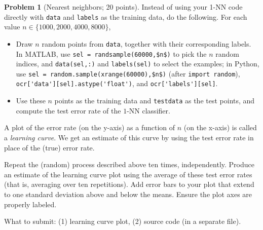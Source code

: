 \documentclass[11pt]{article}
\newcommand\braces[1]{\{#1\}}
\theoremstyle{definition}
\newtheorem{problem}{Problem}
\begin{document}
\begin{problem}[Nearest neighbors; 20 points]
  Instead of using your 1-NN code directly with \texttt{data} and
  \texttt{labels} as the training data, do the following.
  For each value $n \in \braces{1000,2000,4000,8000}$,
  \begin{itemize}
    \item
      Draw $n$ random points from \texttt{data}, together with their
      corresponding labels.
      In MATLAB, use \lstinline{sel = randsample(60000,$n$)} to pick the
      $n$ random indices, and \texttt{data(sel,:)} and
      \lstinline{labels(sel)} to select the examples; in Python, use
      \lstinline{sel = random.sample(xrange(60000),$n$)} (after
      \lstinline{import random}),
      \lstinline{ocr['data'][sel].astype('float')}, and
      \lstinline{ocr['labels'][sel]}.

    \item
      Use these $n$ points as the training data and \texttt{testdata}
      as the test points, and compute the test error rate of the
      $1$-NN classifier.

  \end{itemize}
  A plot of the error rate (on the y-axis) as a function of $n$ (on
  the x-axis) is called a \emph{learning curve}.
  We get an estimate of this curve by using the test error rate in
  place of the (true) error rate.

  Repeat the (random) process described above ten times, independently.
  Produce an estimate of the learning curve plot using the average of
  these test error rates (that is, averaging over ten repetitions).
  Add error bars to your plot that extend to one standard deviation
  above and below the means.
  Ensure the plot axes are properly labeled.

  What to submit:
  (1) learning curve plot, (2) source code (in a separate file).
\end{problem}
\end{document}
